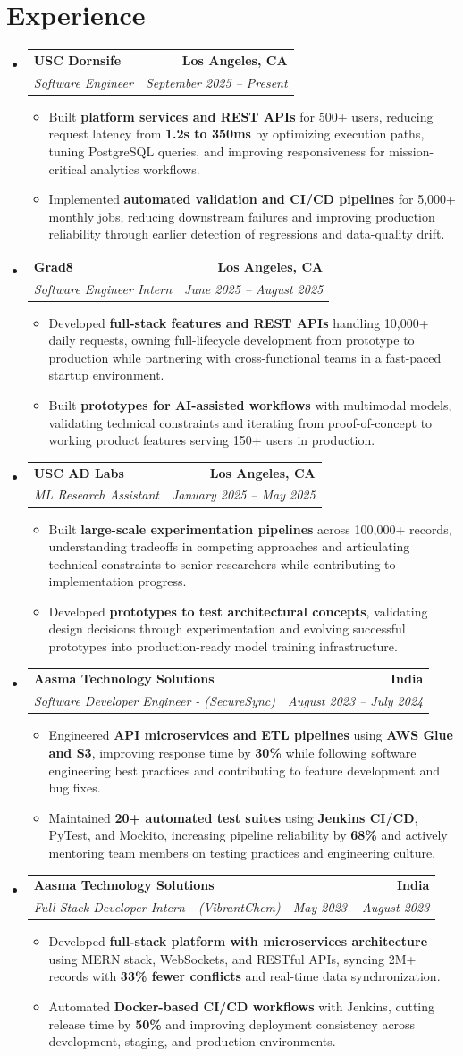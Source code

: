 \documentclass[letterpaper,10pt]{article}
\makeatletter
\newcommand{\resumeItem}[1]{\item\small{{#1 \vspace{-2pt}}}}
\newcommand{\resumeSubheading}[4]{\vspace{-1pt}\item\begin{tabular*}{1.0\textwidth}[t]{l@{\extracolsep{\fill}}r}\textbf{#1} & \textbf{\small #2} \\\textit{\small#3} & \textit{\small #4} \\\end{tabular*}\vspace{-2pt}}
\newcommand{\resumeSubHeadingListStart}{\begin{itemize}[leftmargin=0.0in, label={}]}
\newcommand{\resumeSubHeadingListEnd}{\end{itemize}}
\newcommand{\resumeItemListStart}{\begin{itemize}[leftmargin=0.15in,label=\textbullet,itemsep=2pt,topsep=0pt,parsep=0pt,partopsep=0pt]}
\newcommand{\resumeItemListEnd}{\end{itemize}\vspace{-4pt}}
\makeatother
\begin{document}
\section{Experience}
\resumeSubHeadingListStart
\resumeSubheading{USC Dornsife}{Los Angeles, CA}{Software Engineer}{September 2025 -- Present}
\resumeItemListStart
\resumeItem{Built \textbf{platform services and REST APIs} for 500+ users, reducing request latency from \textbf{1.2s to 350ms} by optimizing execution paths, tuning PostgreSQL queries, and improving responsiveness for mission-critical analytics workflows.}
\resumeItem{Implemented \textbf{automated validation and CI/CD pipelines} for 5,000+ monthly jobs, reducing downstream failures and improving production reliability through earlier detection of regressions and data-quality drift.}
\resumeItemListEnd
\resumeSubheading{Grad8}{Los Angeles, CA}{Software Engineer Intern}{June 2025 -- August 2025}
\resumeItemListStart
\resumeItem{Developed \textbf{full-stack features and REST APIs} handling 10,000+ daily requests, owning full-lifecycle development from prototype to production while partnering with cross-functional teams in a fast-paced startup environment.}
\resumeItem{Built \textbf{prototypes for AI-assisted workflows} with multimodal models, validating technical constraints and iterating from proof-of-concept to working product features serving 150+ users in production.}
\resumeItemListEnd
\resumeSubheading{USC AD Labs}{Los Angeles, CA}{ML Research Assistant}{January 2025 -- May 2025}
\resumeItemListStart
\resumeItem{Built \textbf{large-scale experimentation pipelines} across 100,000+ records, understanding tradeoffs in competing approaches and articulating technical constraints to senior researchers while contributing to implementation progress.}
\resumeItem{Developed \textbf{prototypes to test architectural concepts}, validating design decisions through experimentation and evolving successful prototypes into production-ready model training infrastructure.}
\resumeItemListEnd
\resumeSubheading{Aasma Technology Solutions}{India}{Software Developer Engineer - (SecureSync)}{August 2023 -- July 2024}
\resumeItemListStart
\resumeItem{Engineered \textbf{API microservices and ETL pipelines} using \textbf{AWS Glue and S3}, improving response time by \textbf{30\%} while following software engineering best practices and contributing to feature development and bug fixes.}
\resumeItem{Maintained \textbf{20+ automated test suites} using \textbf{Jenkins CI/CD}, PyTest, and Mockito, increasing pipeline reliability by \textbf{68\%} and actively mentoring team members on testing practices and engineering culture.}
\resumeItemListEnd
\resumeSubheading{Aasma Technology Solutions}{India}{Full Stack Developer Intern - (VibrantChem)}{May 2023 -- August 2023}
\resumeItemListStart
\resumeItem{Developed \textbf{full-stack platform with microservices architecture} using MERN stack, WebSockets, and RESTful APIs, syncing 2M+ records with \textbf{33\% fewer conflicts} and real-time data synchronization.}
\resumeItem{Automated \textbf{Docker-based CI/CD workflows} with Jenkins, cutting release time by \textbf{50\%} and improving deployment consistency across development, staging, and production environments.}
\resumeItemListEnd
\resumeSubHeadingListEnd
\vspace{-14pt}
\end{document}
